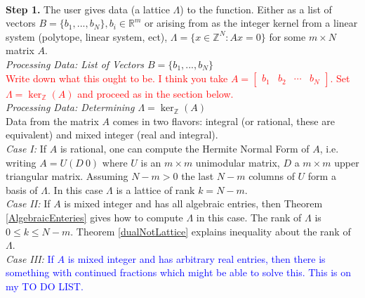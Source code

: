 \documentclass{article}
\newcommand{\nl}{\bigskip \\ } %
\renewcommand{\leq}{\leqslant}
\renewcommand{\geq}{\geqslant}
\newcommand{\Z}[0]{\mathbb{Z}}		%
\newcommand{\R}[0]{\mathbb{R}}		%
\newtheorem{prop}[thm]{Proposition}
\theoremstyle{definition}
\theoremstyle{remark}
\begin{document}


\nl
\textbf{Step 1.} The user gives data (a lattice $\Lambda$) to the function.  Either as a list of vectors $B=\{b_1,...,b_N\}, b_i\in \R^m$ or arising from as the integer kernel from a linear system (polytope, linear system, ect), $\Lambda = \{x\in \Z^N: Ax=0\}$ for some $m\times N$ matrix $A$. %
\nl 
\indent \textit{Processing Data: List of Vectors $B=\{b_1,...,b_N\}$}\nl 
\textcolor{red}{Write down what this ought to be. I think you take $A =\begin{bmatrix} b_1 &b_2 & \cdots & b_N\end{bmatrix}.$ Set $\Lambda = \ker_\Z(A)$ and proceed as in the section below.}%
\nl 
\indent \textit{Processing Data: Determining $\Lambda= \ker_\Z(A)$}\nl 
Data from the matrix $A$ comes in two flavors: integral (or rational, these are equivalent) and  mixed integer (real and integral).  \nl 
\indent \textit{Case I:} If $A$ is rational, one can compute the Hermite Normal Form of $A$, i.e. writing $A = U(D~0)$ where $U$ is an $m\times m$ unimodular matrix, $D$ a $m\times m$ upper triangular matrix. Assuming $N-m>0$ the last $N-m$ columns of $U$ form a basis of $\Lambda$. In this case $\Lambda$ is a lattice of rank $k=N-m$.  \nl 
\indent \textit{Case II:} If $A$ is mixed integer and has all algebraic entries, then Theorem \ref{AlgebraicEnteries} gives how to compute $\Lambda$ in this case. The rank of $\Lambda$ is $0\leq k\leq N-m$. Theorem \ref{dualNotLattice} explains inequality about the rank of $\Lambda$.   \nl %
\indent \textit{Case III:} \textcolor{blue}{If $A$ is mixed integer and has arbitrary real entries, then there is something with continued fractions which might be able to solve this. This is on my TO DO LIST.}
\end{document}
